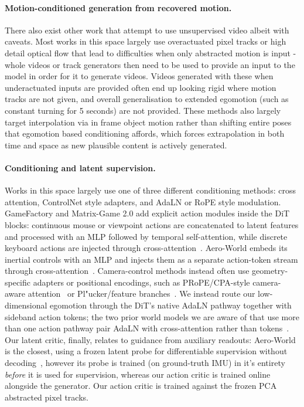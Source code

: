 \documentclass[letterpaper]{article} %
\begin{document}
\paragraph{Motion-conditioned generation from recovered motion.}
There also exist other work that attempt to use unsupervised video albeit with caveats. Most works in this space largely use overactuated pixel tracks \cite{motionprompt} or high detail optical flow \cite{flovd, onlyflow} that lead to difficulties when only abstracted motion is input - whole videos or track generators then need to be used to provide an input to the model in order for it to generate videos. Videos generated with these when underactuated inputs are provided often end up looking rigid where motion tracks are not given, and overall generalisation to extended egomotion (such as constant turning for 5 seconds) are not provided. These methods also largely target interpolation via in frame object motion rather than shifting entire poses that egomotion based conditioning affords, which forces extrapolation in both time and space as new plausible content is actively generated.

\paragraph{Conditioning and latent supervision.}
Works in this space largely use one of three different conditioning methods: cross attention, ControlNet style adapters, and AdaLN or RoPE style modulation. GameFactory and Matrix-Game 2.0 add explicit action modules inside the DiT blocks: continuous mouse or viewpoint actions are concatenated to latent features and processed with an MLP followed by temporal self-attention, while discrete keyboard actions are injected through cross-attention~\cite{gamefactory, matrixgame2}. Aero-World embeds its inertial controls with an MLP and injects them as a separate action-token stream through cross-attention~\cite{aeroworld}. Camera-control methods instead often use geometry-specific adapters or positional encodings, such as PRoPE/CPA-style camera-aware attention~\cite{prope, cpa} or Pl"ucker/feature branches~\cite{cameractrl, motionctrl}. We instead route our low-dimensional egomotion through the DiT's native AdaLN pathway together with sideband action tokens; the two prior world models we are aware of that use more than one action pathway pair AdaLN with cross-attention rather than tokens~\cite{wovr, dexac}. Our latent critic, finally, relates to guidance from auxiliary readouts: Aero-World is the closest, using a frozen latent probe for differentiable supervision without decoding~\cite{aeroworld}, however its probe is trained (on ground-truth IMU) in it's entirety \emph{before} it is used for supervision, whereas our action critic is trained online alongside the generator. Our action critic is trained against the frozen PCA abstracted pixel tracks. 
\end{document}
